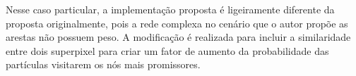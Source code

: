 Nesse caso particular, a implementação proposta é ligeiramente
diferente da proposta originalmente, pois a rede complexa no cenário
que o autor propõe as arestas não possuem peso. A modificação é
realizada para incluir a similaridade entre dois superpixel para criar
um fator de aumento da probabilidade das partículas visitarem os nós
mais promissores.


\begin{figure}[!h]
        \captionsetup{width=12cm}
		\centering
\end{figure}
\FloatBarrier

\begin{figure}[!h]
        \captionsetup{width=12cm}
		\centering
\end{figure}
\FloatBarrier

